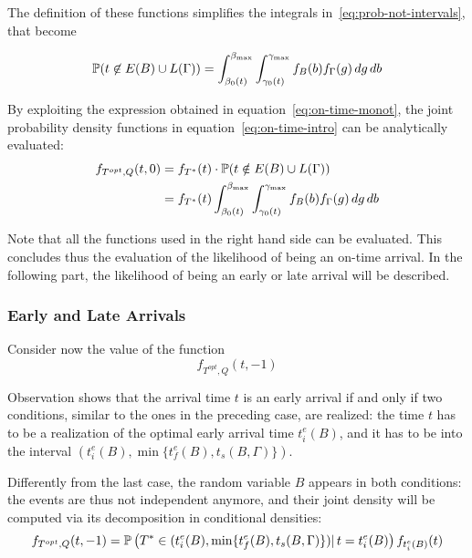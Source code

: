 The definition of these functions simplifies the integrals in~\eqref{eq:prob-not-intervals}, that become

\begin{equation}
  \label{eq:on-time-monot}
  \mathbb{P}( t \not\in E(B) \cup L(\Gamma)) = \int_{\beta_0(t)}^{\beta_{\text{max}}}\int_{\gamma_0(t)}^{\gamma_{\text{max}}}f_B(b)f_\Gamma(g)\, dg\, db
\end{equation}

By exploiting the expression obtained in equation~\eqref{eq:on-time-monot},
the joint probability density functions in equation~\eqref{eq:on-time-intro} can be analytically evaluated:
\begin{equation}
  \label{eq:on-time-final}
  \begin{split}
    f_{T^{opt}, Q}(t, 0) & = f_{T^*}(t) \cdot \mathbb{P}(t \notin E(B) \cup L(\Gamma)) \\
    & = f_{T^*}(t)\int_{\beta_0(t)}^{\beta_{\text{max}}}\int_{\gamma_0(t)}^{\gamma_{\text{max}}}f_B(b)f_\Gamma(g)\, dg\, db
  \end{split}
\end{equation}

Note that all the functions used in the right hand side can be evaluated.
This concludes thus the evaluation of the likelihood of being an on-time arrival.
In the following part, the likelihood of being an early or late arrival will be described.

\subsubsection{Early and Late Arrivals}

Consider now the value of the function
\begin{equation*}
  f_{T^{opt}, Q}(t, -1)
\end{equation*}

Observation shows that the arrival time \(t\) is an early arrival if and only if two conditions,
similar to the ones in the preceding case,
are realized:
the time \(t\) has to be a realization of the optimal early arrival time \(t_i^e(B)\),
and it has to be into the interval \((t_i^e(B), \min\{t_f^e(B), t_s(B, \Gamma)\})\).

Differently from the last case, the random variable \(B\) appears in both conditions:
the events are thus not independent anymore,
and their joint density will be computed via its decomposition in conditional densities:
\begin{equation}
  \label{eq:late-joint-decomp}
  f_{T^{opt}, Q}(t, -1) = \mathbb{P}\left(T^* \in (t_i^e(B), \min\{t_f^e(B), t_s(B, \Gamma)\})|\, t = t_i^e(B)\right) f_{t_i^e(B)}(t)
\end{equation}

